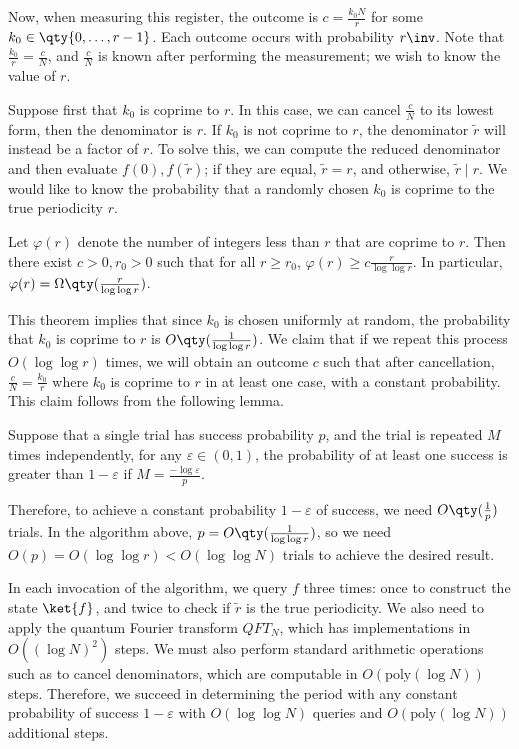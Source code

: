 Now, when measuring this register, the outcome is $c = \frac{k_0N}{r}$ for some $k_0 \in \qty{0, \dots, r-1}$.
Each outcome occurs with probability $r\inv$.
Note that $\frac{k_0}{r} = \frac{c}{N}$, and $\frac{c}{N}$ is known after performing the measurement; we wish to know the value of $r$.

Suppose first that $k_0$ is coprime to $r$.
In this case, we can cancel $\frac{c}{N}$ to its lowest form, then the denominator is $r$.
If $k_0$ is not coprime to $r$, the denominator $\widetilde r$ will instead be a factor of $r$.
To solve this, we can compute the reduced denominator and then evaluate $f(0), f(\widetilde r)$; if they are equal, $\widetilde r = r$, and otherwise, $\widetilde r \mid r$.
We would like to know the probability that a randomly chosen $k_0$ is coprime to the true periodicity $r$.
\begin{theorem}
    Let $\varphi(r)$ denote the number of integers less than $r$ that are coprime to $r$.
    Then there exist $c > 0, r_0 > 0$ such that for all $r \geq r_0$, $\varphi(r) \geq c \frac{r}{\log \log r}$.
    In particular, $\varphi(r) = \Omega\qty(\frac{r}{\log \log r})$.
\end{theorem}
This theorem implies that since $k_0$ is chosen uniformly at random, the probability that $k_0$ is coprime to $r$ is $O\qty(\frac{1}{\log \log r})$.
We claim that if we repeat this process $O(\log \log r)$ times, we will obtain an outcome $c$ such that after cancellation, $\frac{c}{N} = \frac{k_0}{r}$ where $k_0$ is coprime to $r$ in at least one case, with a constant probability.
This claim follows from the following lemma.
\begin{lemma}
    Suppose that a single trial has success probability $p$, and the trial is repeated $M$ times independently, for any $\varepsilon \in (0,1)$, the probability of at least one success is greater than $1 - \varepsilon$ if $M = \frac{-\log \varepsilon}{p}$.
\end{lemma}
Therefore, to achieve a constant probability $1 - \varepsilon$ of success, we need $O\qty(\frac{1}{p})$ trials.
In the algorithm above, $p = O\qty(\frac{1}{\log \log r})$, so we need $O(p) = O(\log \log r) < O(\log \log N)$ trials to achieve the desired result.

In each invocation of the algorithm, we query $f$ three times: once to construct the state $\ket{f}$, and twice to check if $\widetilde r$ is the true periodicity.
We also need to apply the quantum Fourier transform $QFT_N$, which has implementations in $O((\log N)^2)$ steps.
We must also perform standard arithmetic operations such as to cancel denominators, which are computable in $O(\mathrm{poly}(\log N))$ steps.
Therefore, we succeed in determining the period with any constant probability of success $1 - \varepsilon$ with $O(\log \log N)$ queries and $O(\mathrm{poly}(\log N))$ additional steps.

